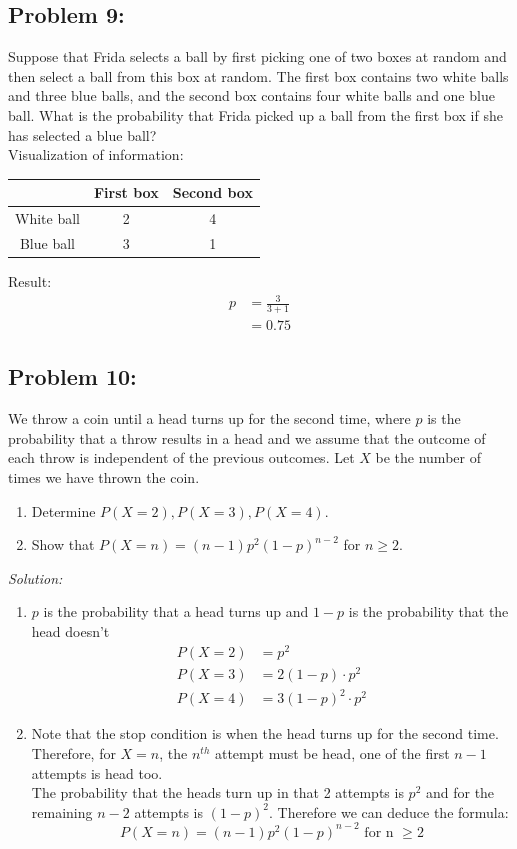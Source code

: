 \documentclass[a4paper]{article}
\begin{document}
	\subsection*{Problem 9:}
	Suppose that Frida selects a ball by first picking one of two boxes at random and then select a ball from this box at random. The first box contains two white balls and three blue balls, and the second box contains four white balls and one blue ball. What is the probability that Frida picked up a ball from the first box if she has selected a blue ball? \\
	
	Visualization of information:
	\begin{center}
		\begin{tabular}{c|c|c}
			& First box & Second box \\
			\hline
			White ball & 2 & 4 \\
			\hline
			Blue ball & 3 & 1
		\end{tabular}
	\end{center}
	Result:
	\begin{align*}
	p &= \frac{3}{3 + 1} \\
	&= 0.75
	\end{align*}
	\subsection*{Problem 10:}
	We throw a coin until a head turns up for the second time, where $p$ is the probability that a throw results in a head and we assume that the outcome of each throw is independent of the previous outcomes. Let $X$ be the number of times we have thrown the coin.
	\begin{enumerate}
		\item Determine $P(X = 2), P(X = 3), P(X = 4)$.
		\item Show that $P(X = n) = (n-1) p^2 (1-p)^{n - 2}$ for $n \geq 2$.
	\end{enumerate}
	\textit{Solution:} 
	\begin{enumerate}
	    \item $p$ is the probability that a head turns up and $1-p$ is the probability that the head doesn't
	    \begin{align*}
	        P(X = 2) &= p^{2} \\
	        P(X = 3) &= 2(1-p)\cdot p^{2} \\
	        P(X = 4) &= 3(1-p)^{2} \cdot p^{2} 
	    \end{align*}
	    \item Note that the stop condition is when the head turns up for the second time. Therefore, for $X = n$, the $n_{}^{th}$ attempt must be head, one of the first $n-1$ attempts is head too. \\
	    The probability that the heads turn up in that 2 attempts is $p^{2}$ and for the remaining $n-2$ attempts is $(1-p)^{2}$.
	    Therefore we can deduce the formula:
	    \begin{equation*}
	        P(X = n) = (n-1) p^2 (1-p)^{n - 2} \text{ for n } \geq 2
	    \end{equation*}
	\end{enumerate}
	
\end{document}
